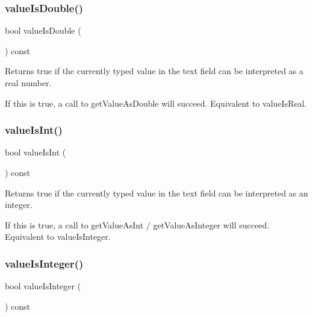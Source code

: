 \subsubsection{\texorpdfstring{value\+Is\+Double()}{valueIsDouble()}}
{\footnotesize\ttfamily bool value\+Is\+Double (\begin{DoxyParamCaption}{ }\end{DoxyParamCaption}) const\hspace{0.3cm}{\ttfamily [virtual]}}



Returns true if the currently typed value in the text field can be interpreted as a real number. 

If this is true, a call to get\+Value\+As\+Double will succeed. Equivalent to value\+Is\+Real. \mbox{\label{classGTextField_a4bccf08b3b712af3839106a1cbdc5d02}} 
\subsubsection{\texorpdfstring{value\+Is\+Int()}{valueIsInt()}}
{\footnotesize\ttfamily bool value\+Is\+Int (\begin{DoxyParamCaption}{ }\end{DoxyParamCaption}) const\hspace{0.3cm}{\ttfamily [virtual]}}



Returns true if the currently typed value in the text field can be interpreted as an integer. 

If this is true, a call to get\+Value\+As\+Int / get\+Value\+As\+Integer will succeed. Equivalent to value\+Is\+Integer. \mbox{\label{classGTextField_af5aaf003739648d9aee89a17e715a57e}} 
\subsubsection{\texorpdfstring{value\+Is\+Integer()}{valueIsInteger()}}
{\footnotesize\ttfamily bool value\+Is\+Integer (\begin{DoxyParamCaption}{ }\end{DoxyParamCaption}) const\hspace{0.3cm}{\ttfamily [virtual]}}




